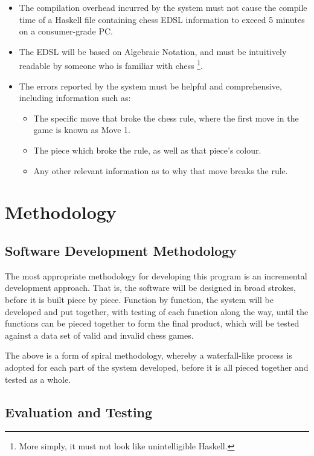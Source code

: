 \documentclass[12pt, a4paper]{scrartcl}
\begin{document}
\begin{itemize}
    \item The compilation overhead incurred by the system must not cause the compile time of a Haskell file containing chess EDSL information to exceed 5 minutes on a consumer-grade PC.
    \item The EDSL will be based on Algebraic Notation, and must be intuitively readable by someone who is familiar with chess \footnote{More simply, it must not look like unintelligible Haskell.}.
    \item The errors reported by the system must be helpful and comprehensive, including information such as:
          \begin{itemize}
              \item The specific move that broke the chess rule, where the first move in the game is known as Move 1.
              \item The piece which broke the rule, as well as that piece's colour.
              \item Any other relevant information as to why that move breaks the rule.
          \end{itemize}
\end{itemize}

\section{Methodology}

\subsection{Software Development Methodology}

The most appropriate methodology for developing this program is an incremental development approach. That is, the software will be designed in broad strokes, before it is built piece by piece. Function by function, the system will be developed and put together, with testing of each function along the way, until the functions can be pieced together to form the final product, which will be tested against a data set of valid and invalid chess games.

The above is a form of spiral methodology, whereby a waterfall-like process is adopted for each part of the system developed, before it is all pieced together and tested as a whole.

\subsection{Evaluation and Testing}
\end{document}

